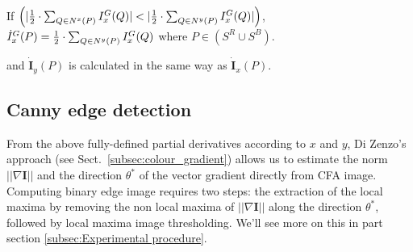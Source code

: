 \documentclass[twoside]{article}
\begin{document}
		
		If $\left(|\frac{1}{2}\cdot\sum_{Q \in \N{x}(P)} I^G_x(Q)|<|\frac{1}{2}\cdot\sum_{Q \in \N{y}(P)} I^G_x(Q)|\right)$, $\dot{I}^G_x(P)=\frac{1}{2}\cdot\sum_{Q \in N^{y}(P)} I^G_x(Q)$ where $P \in (S^R \cup S^B)$.
		
		
		

		\noindent and $\dot{\textbf{I}}_y(P)$ is calculated in the same way as $\dot{\textbf{I}}_x(P)$.  


				

		
		
	
	
	

















\subsection{Canny edge detection}
\label{Canny edge detection}
From the above fully-defined partial derivatives according to $x$ and $y$, Di Zenzo's approach (see Sect.~\ref{subsec:colour_gradient}) allows us to estimate the norm $||\nabla \mathbf{I}||$ and the direction $\theta^{*}$ of the vector gradient directly from CFA image.
Computing binary edge image requires two steps: the extraction of the local maxima by removing the non local maxima of $||\nabla \mathbf{I}||$ along the direction $\theta^{*}$, followed by local maxima image thresholding. We'll see more on this in part section \ref{subsec:Experimental procedure}.     
\end{document}
